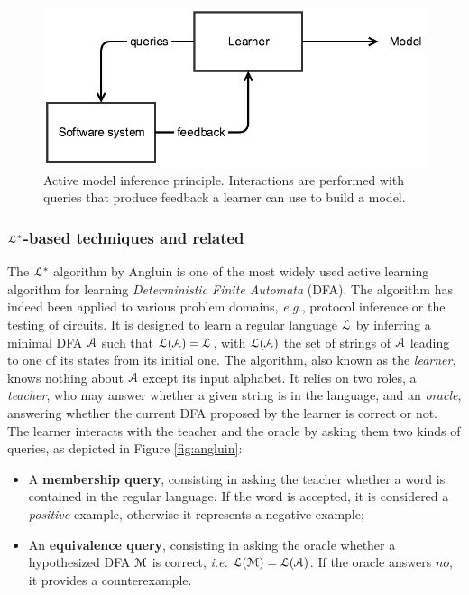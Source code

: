 \begin{figure}[h]
    \begin{center}
        \includegraphics[width=1.0\linewidth]{figures/active.png}
    \end{center}

    \caption{Active model inference principle. Interactions are
        performed with queries that produce feedback a learner
        can use to build a model.}
    \label{fig:active}
\end{figure}

\subsubsection{$\EuScript{L}^*$-based techniques and related}
\label{sec:active-letoile}

The $\EuScript{L}^*$ algorithm by Angluin \cite{Angluin198787} is
one of the most widely used active learning algorithm for
learning \textit{Deterministic Finite Automata} (DFA). The
algorithm has indeed been applied to various problem domains,
\emph{e.g.}, protocol inference or the testing of circuits. It is
designed to learn a regular language $\EuScript{L}$ by inferring
a minimal DFA $\EuScript{A}$ such that
$\EuScript{L}(\EuScript{A})=\EuScript{L}$, with
$\EuScript{L}(\EuScript{A})$ the set of strings of $\EuScript{A}$
leading to one of its states from its initial one. The algorithm,
also known as the \textit{learner}, knows nothing about
$\EuScript{A}$ except its input alphabet. It relies on two roles,
a \textit{teacher}, who may answer whether a given string is in
the language, and an \textit{oracle}, answering whether the
current DFA proposed by the learner is correct or not. The
learner interacts with the teacher and the oracle by asking them
two kinds of queries, as depicted in Figure \ref{fig:angluin}:

\begin{itemize}
    \item A \textbf{membership query}, consisting in asking the
        teacher whether a word is contained in the regular
        language.  If the word is accepted, it is considered a
        \textit{positive} example, otherwise it represents a
        negative example;

    \item An \textbf{equivalence query}, consisting in asking the
        oracle whether a hypothesized DFA $\EuScript{M}$ is
        correct, \emph{i.e.} $\EuScript{L}(\EuScript{M}) =
        \EuScript{L}(\EuScript{A})$. If the oracle answers $no$,
        it provides a counterexample.
\end{itemize}

